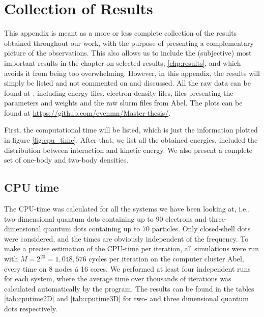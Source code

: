 \chapter{Collection of Results} \label{chp:totalresults}
This appendix is meant as a more or less complete collection of the results obtained throughout our work, with the purpose of presenting a complementary picture of the observations. This also allows us to include the (subjective) most important results in the chapter on selected results, \ref{chp:results}, and which avoids it from being too overwhelming. However, in this appendix, the results will simply be listed and not commented on and discussed. All the raw data can be found at \cite{nordhagen_even_marius_2019_3477946}, including energy files, electron density files, files presenting the parameters and weights and the raw slurm files from Abel. The plots can be found at \url{https://github.com/evenmn/Master-thesis/}.

First, the computational time will be listed, which is just the information plotted in figure \eqref{fig:cpu_time}. After that, we list all the obtained energies, included the distribution between interaction and kinetic energy. We also present a complete set of one-body and two-body densities. 

\section{CPU time} \label{sec:cputime}
The CPU-time was calculated for all the systems we have been looking at, i.e., two-dimensional quantum dots containing up to 90 electrons and three-dimensional quantum dots containing up to 70 particles. Only closed-shell dots were considered, and the times are obviously independent of the frequency. To make a precise estimation of the CPU-time per iteration, all simulations were run with $M=2^{20}=1,048,576$ cycles per iteration on the computer cluster Abel, every time on 8 nodes á 16 cores. We performed at least four independent runs for each system, where the average time over thousands of iterations was calculated automatically by the program. The results can be found in the tables \eqref{tab:cputime2D} and \eqref{tab:cputime3D} for two- and three dimensional quantum dots respectively. 

